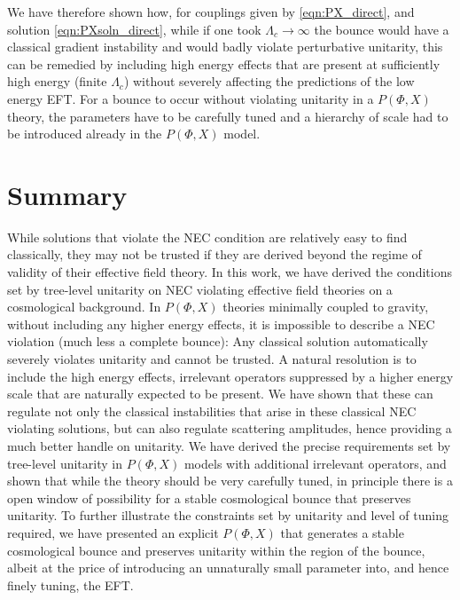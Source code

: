 \documentclass[12pt]{article}
\begin{document}
We have therefore shown how, for couplings given by \eqref{eqn:PX_direct}, and solution \eqref{eqn:PXsoln_direct}, while if one took $\Lambda_c\to \infty$ the bounce would have a classical gradient instability and would badly violate perturbative unitarity, this can be remedied by including high energy effects that are present at  sufficiently high energy  (finite $\Lambda_c$) without severely affecting the predictions of the low energy EFT. For a bounce to occur without violating unitarity in a $P(\Phi,X)$ theory, the parameters have to be carefully tuned and a hierarchy of scale had to be introduced already in the $P(\Phi,X)$ model.





\section{Summary}
\label{sec:conc}


While solutions that violate the NEC condition are relatively easy to find classically, they may not be trusted if they are derived beyond the regime of validity of their effective field theory. In this work, we have derived the conditions set by tree-level unitarity on NEC violating effective field theories on a cosmological background. In $P(\Phi,X)$ theories minimally coupled to gravity, without including any higher energy effects, it is impossible to describe a NEC violation (much less a complete bounce): Any classical solution automatically severely violates unitarity and cannot be trusted. A natural resolution is to include the high energy effects, irrelevant operators suppressed by a higher energy scale that are naturally expected to be present. We have shown that these can regulate not only the classical instabilities that arise in these classical NEC violating solutions, but can also regulate scattering amplitudes, hence providing a much better handle on unitarity. We have derived the precise requirements set by tree-level unitarity in $P(\Phi,X)$ models with additional irrelevant operators, and shown that while the theory should be very carefully tuned, in principle there is a open window of possibility for a stable cosmological bounce that preserves unitarity. To further illustrate the constraints set by unitarity and level of tuning required, we have presented an explicit $P(\Phi,X)$ that generates a stable cosmological bounce and preserves unitarity within the region of the bounce, albeit at the price of introducing an unnaturally small parameter into, and hence finely tuning, the EFT. \\
\end{document}

